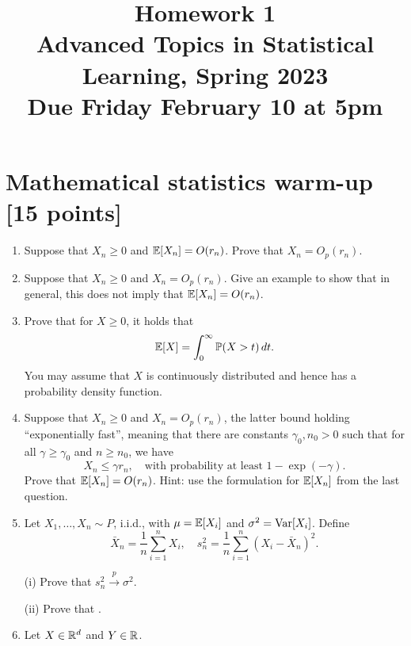 \documentclass{article}
\title{Homework 1 \\ \smallskip
\large Advanced Topics in Statistical Learning, Spring 2023 \\ \smallskip
Due Friday February 10 at 5pm}
\date{}
\begin{document}
\maketitle
\RaggedRight
\vspace{-50pt}

\section{Mathematical statistics warm-up [15 points]}

\def\pto{\overset{p}{\to}}
\def\dto{\overset{d}{\to}}

\begin{enumerate}[label=(\alph*)]
\item Suppose that $X_n \geq 0$ and $\mathbb{E}[X_n]=O(r_n)$. Prove that $X_n=O_p(r_n)$.
  \marginpar{\small [1 pt]} 

\item Suppose that $X_n \geq 0$ and $X_n=O_p(r_n)$.  Give an example to show
  that in general, this does not  imply that $\mathbb{E}[X_n]=O(r_n)$.   
  \marginpar{\small [1 pt]} 

\item Prove that for $X \geq 0$, it holds that 
  \[
  \mathbb{E}[X] = \int_0^\infty \mathbb{P}(X>t) \, dt.
  \]  
  You may assume that $X$ is continuously distributed and hence has a probability
  density function. 
  \marginpar{\small [2 pts]} 

\item Suppose that $X_n \geq 0$ and $X_n=O_p(r_n)$, the latter bound holding
  ``exponentially fast'', meaning that there are constants $\gamma_0,n_0>0$ such 
  that for all $\gamma \geq \gamma_0$ and $n \geq n_0$, we have    
  \[
  X_n \leq \gamma r_n, \quad \text{with probability at least $1-\exp(-\gamma)$}.    
  \]
  Prove that $\mathbb{E}[X_n]=O(r_n)$. Hint: use the formulation for $\mathbb{E}[X_n]$ from the
  last question. 
  \marginpar{\small [3 pts]} 

\item Let $X_1,\ldots, X_n \sim P$, i.i.d., with $\mu = \mathbb{E}[X_i]$ and $\sigma^2 = 
  \mathrm{Var}[X_i]$. Define   
  \[
  \bar{X}_n = \frac{1}{n}\sum_{i=1}^n X_i, \quad
  s_n^2 = \frac{1}{n}\sum_{i=1}^n (X_i - \bar{X}_n)^2.
  \]

(i) Prove that $s_n^2 \pto \sigma^2$.
\marginpar{\small [1 pt]} 

(ii) Prove that \smash{$\sqrt{n}(\bar{X}_n-\mu)/s_n \dto N(0,1)$}.
\marginpar{\small [1 pt]} 

\item Let $X  \in \mathbb{R}^d$ and $Y \in \mathbb{R}$.


\end{enumerate}
\end{document}
